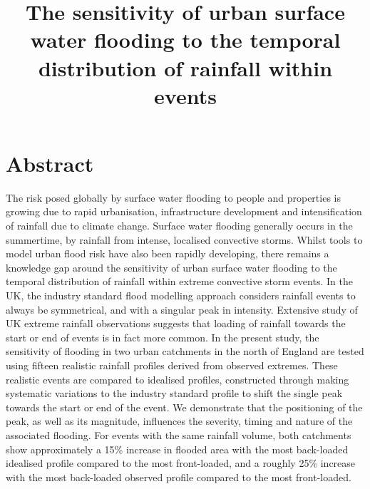 \documentclass[APA,Times2COL]{WileyNJDv5}
\title{\textbf{The sensitivity of urban surface water flooding to the temporal distribution of rainfall within events}}
\date{}
\begin{document}
\maketitle
\vspace{-1.5cm}

\section{Abstract}


The risk posed globally by surface water flooding to people and properties is growing due to rapid urbanisation, infrastructure development and intensification of rainfall due to climate change. Surface water flooding generally occurs in the summertime, by rainfall from intense, localised convective storms. Whilst tools to model urban flood risk have also been rapidly developing, there remains a knowledge gap around the sensitivity of urban surface water flooding to the temporal distribution of rainfall within extreme convective storm events. In the UK, the industry standard flood modelling approach considers rainfall events to always be symmetrical, and with a singular peak in intensity. Extensive study of UK extreme rainfall observations suggests that loading of rainfall towards the start or end of events is in fact more common. In the present study, the sensitivity of flooding in two urban catchments in the north of England are tested using fifteen realistic rainfall profiles derived from observed extremes. These realistic events are compared to idealised profiles, constructed through making systematic variations to the industry standard profile to shift the single peak towards the start or end of the event. We demonstrate that the positioning of the peak, as well as its magnitude, influences the severity, timing and nature of the associated flooding. For events with the same rainfall volume, both catchments show approximately a 15\% increase in flooded area with the most back-loaded idealised profile compared to the most front-loaded, and a roughly 25\% increase with the most back-loaded observed profile compared to the most front-loaded. 
\end{document}
